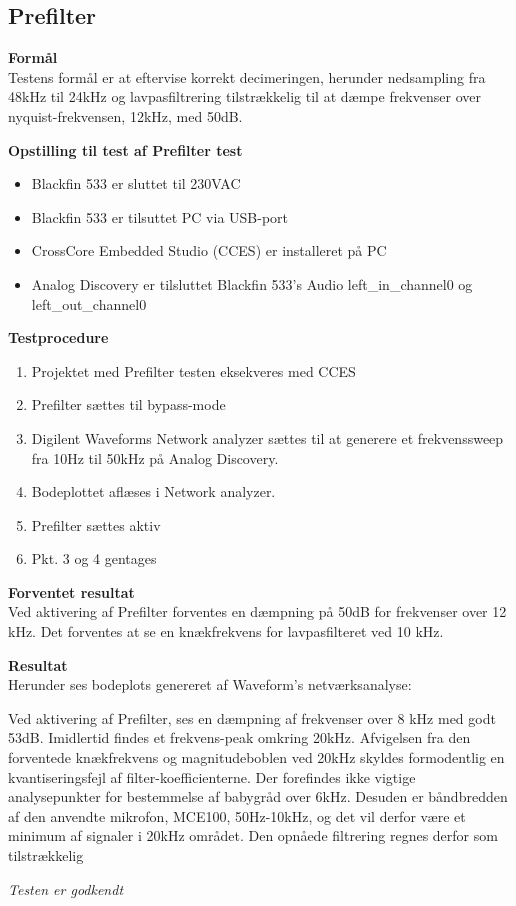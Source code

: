 \subsection*{Prefilter}

\textbf{Formål} \\
Testens formål er at eftervise korrekt decimeringen, herunder nedsampling fra 48kHz til 24kHz og lavpasfiltrering tilstrækkelig til at dæmpe frekvenser over nyquist-frekvensen, 12kHz, med 50dB. 

\textbf{Opstilling til test af Prefilter test}

\begin{itemize}
	\item Blackfin 533 er sluttet til 230VAC
	\item Blackfin 533 er tilsuttet PC via USB-port
	\item CrossCore Embedded Studio (CCES) er installeret på PC
	\item Analog Discovery er tilsluttet Blackfin 533's Audio left\_in\_channel0 og left\_out\_channel0
\end{itemize}

\textbf{Testprocedure}
\begin{enumerate}
	\item Projektet med Prefilter testen eksekveres med CCES 
	\item Prefilter sættes til bypass-mode
	\item Digilent Waveforms Network analyzer sættes til at generere et frekvenssweep fra 10Hz til 50kHz på Analog Discovery. 
	\item Bodeplottet aflæses i Network analyzer. 
	\item Prefilter sættes aktiv
	\item Pkt. 3 og 4 gentages
\end{enumerate}

\textbf{Forventet resultat} \\
Ved aktivering af Prefilter forventes en dæmpning på 50dB for frekvenser over 12 kHz. Det forventes at se en knækfrekvens for lavpasfilteret ved 10 kHz.

\textbf{Resultat} \\
Herunder ses bodeplots genereret af Waveform's netværksanalyse:

Ved aktivering af Prefilter, ses en dæmpning af frekvenser over 8 kHz med godt 53dB. Imidlertid findes et frekvens-peak omkring 20kHz. Afvigelsen fra den forventede knækfrekvens og magnitudeboblen ved 20kHz skyldes formodentlig en kvantiseringsfejl af filter-koefficienterne. Der forefindes ikke vigtige analysepunkter for bestemmelse af babygråd over 6kHz. Desuden er båndbredden  af den anvendte mikrofon, MCE100, 50Hz-10kHz, og det vil derfor være et minimum af signaler i 20kHz området. Den opnåede filtrering regnes derfor som tilstrækkelig

\textit{Testen er godkendt}





